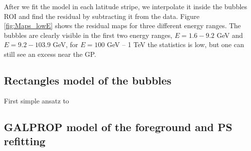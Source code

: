 After we fit the model in each latitude stripe, we interpolate it inside the bubbles ROI and find the residual by subtracting it from the data.
Figure \ref{fig:Maps_lowE} shows the residual maps for three different energy ranges. 
The \Fermi bubbles are clearly visible in the first two energy ranges, $E = 1.6 - 9.2$ GeV and $E = 9.2 - 103.9$ GeV, for 
$E = 100$ GeV -- 1 TeV the statistics is low, but one can still see an excess near the GP.


\subsection{Rectangles model of the bubbles}
\label{sec:box_model}

First simple ansatz to 

\subsection{GALPROP model of the foreground and PS refitting}
\label{sec:galprop_model}

